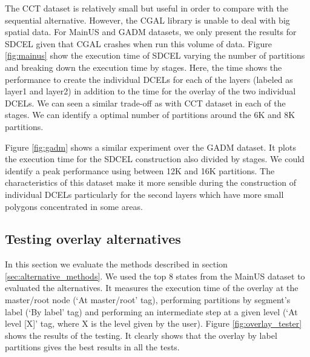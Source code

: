 
The CCT dataset is relatively small but useful in order to compare with the sequential alternative.  However, the CGAL library is unable to deal with big spatial data.  For MainUS and GADM datasets, we only present the results for SDCEL given that CGAL crashes when run this volume of data.  Figure \ref{fig:mainus} show the execution time of SDCEL varying the number of partitions and breaking down the execution time by stages.  Here, the time shows the performance to create the individual DCELs for each of the layers (labeled as layer1 and layer2) in addition to the time for the overlay of the two individual DCELs.  We can seen a similar trade-off as with CCT dataset in each of the stages.  We can identify a optimal number of partitions around the 6K and 8K partitions.  

Figure \ref{fig:gadm} shows a similar experiment over the GADM dataset.  It plots the execution time for the SDCEL construction also divided by stages. We could identify a peak performance using between 12K and 16K partitions.  The characteristics of this dataset make it more sensible during the construction of individual DCELs particularly for the second layers which have more small polygons concentrated in some areas.

\subsection{Testing overlay alternatives}
In this section we evaluate the methods described in section \ref{sec:alternative_methods}.  We used the top 8 states from the MainUS dataset to evaluated the alternatives.  It measures the execution time of the overlay at the master/root node (`At master/root' tag), performing partitions by segment's label (`By label' tag) and performing an intermediate step at a given level (`At level [X]' tag, where X is the level given by the user).  Figure \ref{fig:overlay_tester} shows the results of the testing.  It clearly shows that the overlay by label partitions gives the best results in all the tests.

